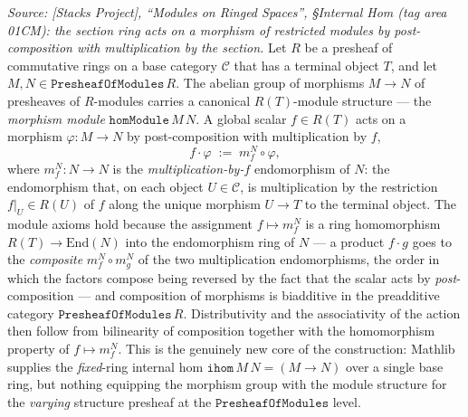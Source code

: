 \begin{definition}\leanok
  \label{def:presheaf_internal_hom_value}
  \textit{Source: [Stacks Project], ``Modules on Ringed Spaces'', \S Internal Hom
  (tag area 01CM): the section ring acts on a morphism of restricted modules by
  post-composition with multiplication by the section.}
  Let \(R\) be a presheaf of commutative rings on a base category \(\mathcal{C}\)
  that has a terminal object \(T\), and let \(M, N \in \mathtt{PresheafOfModules}\,R\).
  The abelian group of morphisms \(M \longrightarrow N\) of presheaves of \(R\)-modules
  carries a canonical \(R(T)\)-module structure --- the \emph{morphism module}
  \(\mathtt{homModule}\,M\,N\). A global scalar \(f \in R(T)\) acts on a morphism
  \(\varphi : M \to N\) by post-composition with multiplication by \(f\),
  \[
    f \cdot \varphi \;:=\; m_f^{N} \circ \varphi,
  \]
  where \(m_f^{N} : N \to N\) is the \emph{multiplication-by-\(f\)} endomorphism of
  \(N\): the endomorphism that, on each object \(U \in \mathcal{C}\), is multiplication
  by the restriction \(f|_U \in R(U)\) of \(f\) along the unique morphism \(U \to T\)
  to the terminal object. The module axioms hold because the assignment
  \(f \mapsto m_f^{N}\) is a ring homomorphism \(R(T) \to \mathrm{End}(N)\) into the
  endomorphism ring of \(N\) --- a product \(f \cdot g\) goes to the \emph{composite}
  \(m_f^{N} \circ m_g^{N}\) of the two multiplication endomorphisms, the order in which
  the factors compose being reversed by the fact that the scalar acts by
  \emph{post}-composition --- and composition of morphisms is biadditive in the
  preadditive category \(\mathtt{PresheafOfModules}\,R\). Distributivity and the
  associativity of the action then follow from bilinearity of composition together with
  the homomorphism property of \(f \mapsto m_f^{N}\). This is the genuinely new core of
  the construction: Mathlib supplies the \emph{fixed}-ring internal hom
  \(\mathtt{ihom}\,M\,N = (M \to N)\) over a single base ring, but nothing equipping the
  morphism group with the module structure for the \emph{varying} structure presheaf at
  the \(\mathtt{PresheafOfModules}\) level.
\end{definition}

